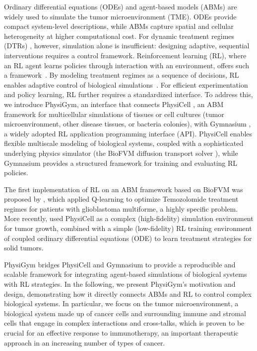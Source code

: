 \documentclass{article}
\begin{document}
Ordinary differential equations (ODEs) and agent-based models (ABMs) are widely used to simulate the tumor microenvironment (TME). ODEs provide compact system-level descriptions, while ABMs capture spatial and cellular heterogeneity at higher computational cost. For dynamic treatment regimes (DTRs) \citep{gray1982arac}, however, simulation alone is insufficient: designing adaptive, sequential interventions requires a control framework. Reinforcement learning (RL), where an RL agent learns policies through interaction with an environment, offers such a framework~\citep{barto1989learning}. By modeling treatment regimes as a sequence of decisions, RL enables adaptive control of biological simulations~\citep{chakraborty2014dynamic}. For efficient experimentation and policy learning, RL further requires a standardized interface. To address this, we introduce PhysiGym, an interface that connects PhysiCell \citep{ghaffarizadeh2018physicell}, an ABM framework for multicellular simulations of tissues or cell cultures (tumor microenvironment, other disease tissues, or bacteria colonies), with Gymnasium \citep{towers2024gymnasium}, a widely adopted RL application programming interface (API). 
PhysiCell enables flexible multiscale modeling of biological systems, coupled with a sophisticated underlying physics simulator (the BioFVM  diffusion transport solver \citep{ghaffarizadeh2016biofvm}), while Gymnasium provides a structured framework for training and evaluating RL policies.

The first implementation of RL on an ABM framework based on BioFVM was proposed by \citet{zade2020reinforcement}, which applied Q-learning \citep{watkins1992q} to optimize Temozolomide treatment regimes for patients with glioblastoma multiforme, a highly specific problem. 
More recently, \citet{aif2025failing} used PhysiCell as a complex (high-fidelity) simulation environment for tumor growth, combined with a simple (low-fidelity) RL training environment of coupled ordinary differential equations (ODE)  to learn treatment strategies for solid tumors.


PhysiGym bridges PhysiCell and Gymnasium to provide a reproducible and scalable framework for integrating agent-based simulations of biological systems with RL strategies. In the following, we present PhysiGym’s motivation and design, demonstrating how it directly connects ABMs and RL to control complex biological systems. In particular, we focus on the tumor microenvironment, a biological system made up of cancer cells and surrounding immune and stromal cells that engage in complex interactions and cross-talks, which is proven to be crucial for an effective response to immunotherapy, an important therapeutic approach in an increasing number of types of cancer. 
\end{document}
